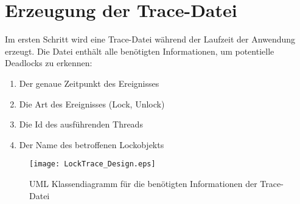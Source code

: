 \section{Erzeugung der Trace-Datei}
\label{section:Erzeugung der Trace-Datei}
Im ersten Schritt wird eine Trace-Datei während der Laufzeit der Anwendung
erzeugt. Die Datei enthält alle benötigten Informationen, um potentielle
Deadlocks zu erkennen:

\begin{enumerate}
  \item Der genaue Zeitpunkt des Ereignisses 
  \item Die Art des Ereignisses (Lock, Unlock)
  \item Die Id des ausführenden Threads
  \item Der Name des betroffenen Lockobjekts
\end{enumerate}

\begin{figure}[ht]
  \texttt{[image: LockTrace\_Design.eps]}
  \caption{UML Klassendiagramm für die benötigten Informationen der Trace-Datei}
  \label{fig:LockTrace_Design}
\end{figure}

